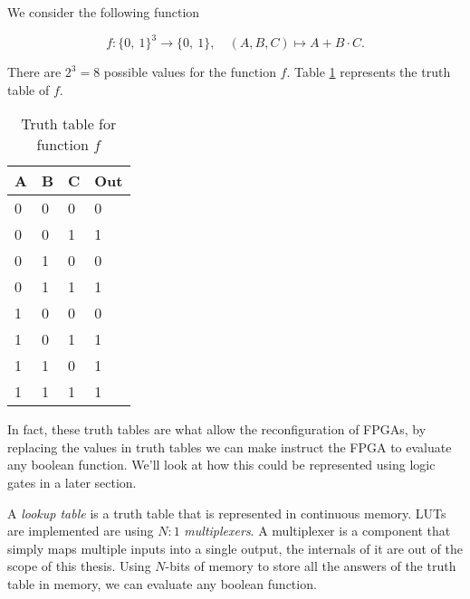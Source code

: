\begin{example}
    \label{ex:boolean_function}
    We consider the following function

    \begin{equation} \label{eq:examle_eq}
    f \colon \{0,\ 1\}^3 \rightarrow \{0,\ 1\},
        \quad (A, B, C) \mapsto A + B \cdot C.
    \end{equation}

    There are $2^3 = 8$ possible values for the function $f$. Table
    \ref{tab:example_truth_table} represents the truth table of $f$.

    \begin{table}[H]
        \centering
        \begin{tabular}{|l|l|l|l|}
            \hline
            A & B & C & Out \\ \hline
            0 & 0 & 0 & 0   \\ \hline
            0 & 0 & 1 & 1   \\ \hline
            0 & 1 & 0 & 0   \\ \hline
            0 & 1 & 1 & 1   \\ \hline
            1 & 0 & 0 & 0   \\ \hline
            1 & 0 & 1 & 1   \\ \hline
            1 & 1 & 0 & 1   \\ \hline
            1 & 1 & 1 & 1   \\ \hline
        \end{tabular}
        \caption{Truth table for function $f$}
        \label{tab:example_truth_table}
    \end{table}

    In fact, these truth tables are what allow the reconfiguration of
    FPGAs, by replacing the values in truth tables we can make instruct the
    FPGA to evaluate any boolean function. We'll look at how this could be
    represented using logic gates in a later section.

\end{example}

\begin{definition}

    A \textit{lookup table} is a truth table that is represented in continuous
    memory. LUTs are implemented are using $N:1$ \textit{multiplexers}. A
    multiplexer is a component that simply maps multiple inputs into a single
    output, the internals of it are out of the scope of this thesis. Using
    $N$-bits of memory to store all the answers of the truth table in memory,
    we can evaluate any boolean function.

\end{definition}

